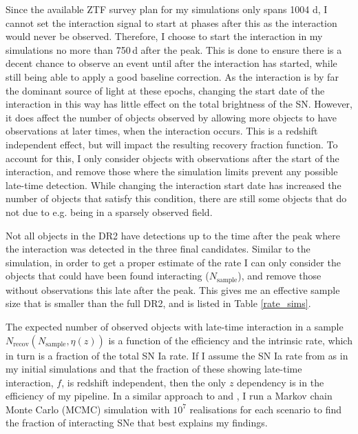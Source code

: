 \documentclass[a4paper,oneside,12pt, class=Latex/Classes/PhDthesisPSnPDF, crop=false]{standalone}
\begin{document}
Since the available ZTF survey plan for my simulations only spans 1004 d, I cannot set the interaction signal to start at phases after this as the interaction would never be observed. Therefore, I choose to start the interaction in my simulations no more than 750\,d after the peak. This is done to ensure there is a decent chance to observe an event until after the interaction has started, while still being able to apply a good baseline correction. As the interaction is by far the dominant source of light at these epochs, changing the start date of the interaction in this way has little effect on the total brightness of the SN. However, it does affect the number of objects observed by allowing more objects to have observations at later times, when the interaction occurs. This is a redshift independent effect, but will impact the resulting recovery fraction function. To account for this, I only consider objects with observations after the start of the interaction, and remove those where the simulation limits prevent any possible late-time detection. While changing the interaction start date has increased the number of objects that satisfy this condition, there are still some objects that do not due to e.g. being in a sparsely observed field.

Not all objects in the DR2 have detections up to the time after the peak where the interaction was detected in the three final candidates. Similar to the simulation, in order to get a proper estimate of the rate I can only consider the objects that could have been found interacting ($N_\text{sample}$), and remove those without observations this late after the peak. This gives me an effective sample size that is smaller than the full DR2, and is listed in Table \ref{rate_sims}.

The expected number of observed objects with late-time interaction in a sample $N_\text{recov}(N_\text{sample}, \eta(z))$ is a function of the efficiency and the intrinsic rate, which in turn is a fraction of the total SN Ia rate. If I assume the SN Ia rate from \citet{SNIa_rate} as in my initial simulations and that the fraction of these showing late-time interaction, $f$, is redshift independent, then the only $z$ dependency is in the efficiency of my pipeline. In a similar approach to \citet{SLSN_rate} and \citet{Ca-rich_rate}, I run a Markov chain Monte Carlo (MCMC) simulation with $10^7$ realisations for each scenario to find the fraction of interacting SNe that best explains my findings.
\end{document}
